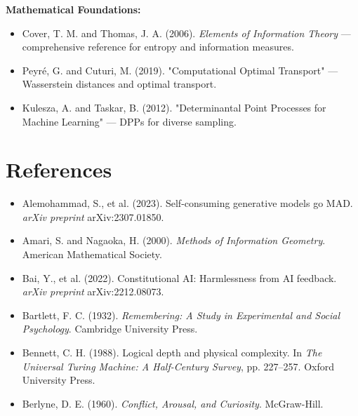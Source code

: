 \textbf{Mathematical Foundations:}
\begin{itemize}
\item Cover, T. M. and Thomas, J. A. (2006). \textit{Elements of Information Theory} --- comprehensive reference for entropy and information measures.
\item Peyré, G. and Cuturi, M. (2019). "Computational Optimal Transport" --- Wasserstein distances and optimal transport.
\item Kulesza, A. and Taskar, B. (2012). "Determinantal Point Processes for Machine Learning" --- DPPs for diverse sampling.
\end{itemize}



\section{References}

\begin{itemize}
\item Alemohammad, S., et al. (2023). Self-consuming generative models go MAD. \textit{arXiv preprint} arXiv:2307.01850.
\end{itemize}

\begin{itemize}
\item Amari, S. and Nagaoka, H. (2000). \textit{Methods of Information Geometry}. American Mathematical Society.
\end{itemize}

\begin{itemize}
\item Bai, Y., et al. (2022). Constitutional AI: Harmlessness from AI feedback. \textit{arXiv preprint} arXiv:2212.08073.
\end{itemize}

\begin{itemize}
\item Bartlett, F. C. (1932). \textit{Remembering: A Study in Experimental and Social Psychology}. Cambridge University Press.
\end{itemize}

\begin{itemize}
\item Bennett, C. H. (1988). Logical depth and physical complexity. In \textit{The Universal Turing Machine: A Half-Century Survey}, pp. 227--257. Oxford University Press.
\end{itemize}

\begin{itemize}
\item Berlyne, D. E. (1960). \textit{Conflict, Arousal, and Curiosity}. McGraw-Hill.
\end{itemize}

